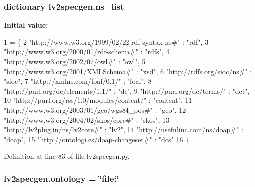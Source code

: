\subsubsection[{\texorpdfstring{ns\+\_\+list}{ns_list}}]{\setlength{\rightskip}{0pt plus 5cm}dictionary lv2specgen.\+ns\+\_\+list}\hypertarget{namespacelv2specgen_a6e064b1968cdd224af353a9d519ab26f}{}\label{namespacelv2specgen_a6e064b1968cdd224af353a9d519ab26f}
{\bfseries Initial value\+:}
\begin{DoxyCode}
1 = \{
2     \textcolor{stringliteral}{"http://www.w3.org/1999/02/22-rdf-syntax-ns#"}   : \textcolor{stringliteral}{"rdf"},
3     \textcolor{stringliteral}{"http://www.w3.org/2000/01/rdf-schema#"}         : \textcolor{stringliteral}{"rdfs"},
4     \textcolor{stringliteral}{"http://www.w3.org/2002/07/owl#"}                : \textcolor{stringliteral}{"owl"},
5     \textcolor{stringliteral}{"http://www.w3.org/2001/XMLSchema#"}             : \textcolor{stringliteral}{"xsd"},
6     \textcolor{stringliteral}{"http://rdfs.org/sioc/ns#"}                      : \textcolor{stringliteral}{"sioc"},
7     \textcolor{stringliteral}{"http://xmlns.com/foaf/0.1/"}                    : \textcolor{stringliteral}{"foaf"},
8     \textcolor{stringliteral}{"http://purl.org/dc/elements/1.1/"}              : \textcolor{stringliteral}{"dc"},
9     \textcolor{stringliteral}{"http://purl.org/dc/terms/"}                     : \textcolor{stringliteral}{"dct"},
10     \textcolor{stringliteral}{"http://purl.org/rss/1.0/modules/content/"}      : \textcolor{stringliteral}{"content"},
11     \textcolor{stringliteral}{"http://www.w3.org/2003/01/geo/wgs84\_pos#"}      : \textcolor{stringliteral}{"geo"},
12     \textcolor{stringliteral}{"http://www.w3.org/2004/02/skos/core#"}          : \textcolor{stringliteral}{"skos"},
13     \textcolor{stringliteral}{"http://lv2plug.in/ns/lv2core#"}                 : \textcolor{stringliteral}{"lv2"},
14     \textcolor{stringliteral}{"http://usefulinc.com/ns/doap#"}                 : \textcolor{stringliteral}{"doap"},
15     \textcolor{stringliteral}{"http://ontologi.es/doap-changeset#"}            : \textcolor{stringliteral}{"dcs"}
16     \}
\end{DoxyCode}


Definition at line 83 of file lv2specgen.\+py.

\subsubsection[{\texorpdfstring{ontology}{ontology}}]{ lv2specgen.\+ontology = \char`\"{}file\+:\char`\"{}}\hypertarget{namespacelv2specgen_a5adf9e932c2700472369ca8590e9eede}{}\label{namespacelv2specgen_a5adf9e932c2700472369ca8590e9eede}


